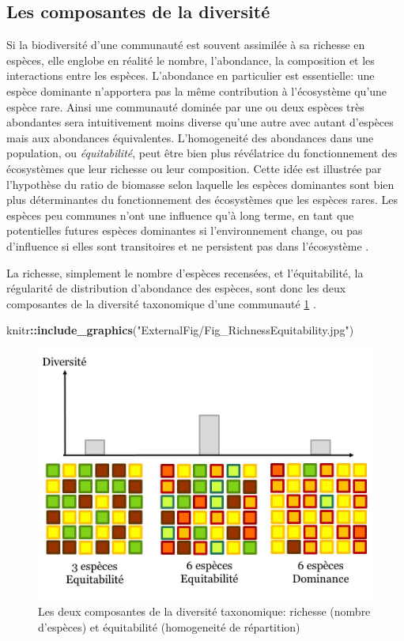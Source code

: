 \documentclass[
  11pt,
  french,
  A4paper,
  extrafontsizes,onecolumn,openright
  ]{memoir}
\newenvironment{Shaded}{\begin{snugshade}}{\end{snugshade}}
\newcommand{\KeywordTok}[1]{\textcolor[rgb]{0.13,0.29,0.53}{\textbf{#1}}}
\newcommand{\StringTok}[1]{\textcolor[rgb]{0.31,0.60,0.02}{#1}}
\newcommand{\OperatorTok}[1]{\textcolor[rgb]{0.81,0.36,0.00}{\textbf{#1}}}
\newcommand{\NormalTok}[1]{#1}
\begin{document}
\subsection{Les composantes de la
diversité}\label{les-composantes-de-la-diversite}

Si la biodiversité d'une communauté est souvent assimilée à sa richesse
en espèces, elle englobe en réalité le nombre, l'abondance, la
composition et les interactions entre les espèces. L'abondance en
particulier est essentielle: une espèce dominante n'apportera pas la
même contribution à l'écosystème qu'une espèce rare. Ainsi une
communauté dominée par une ou deux espèces très abondantes sera
intuitivement moins diverse qu'une autre avec autant d'espèces mais aux
abondances équivalentes. L'homogeneité des abondances dans une
population, ou \emph{équitabilité}, peut être bien plus révélatrice du
fonctionnement des écosystèmes que leur richesse ou leur composition.
Cette idée est illustrée par l'hypothèse du ratio de biomasse selon
laquelle les espèces dominantes sont bien plus déterminantes du
fonctionnement des écosystèmes que les espèces rares. Les espèces peu
communes n'ont une influence qu'à long terme, en tant que potentielles
futures espèces dominantes si l'environnement change, ou pas d'influence
si elles sont transitoires et ne persistent pas dans l'écosystème
\autocite{Grime1998}.

La richesse, simplement le nombre d'espèces recensées, et
l'équitabilité, la régularité de distribution d'abondance des espèces,
sont donc les deux composantes de la diversité taxonomique d'une
communauté \ref{fig:RichEqu} \autocites{Whittaker1965}{Magurran2004}.

\begin{Shaded}
\begin{Highlighting}[]
\NormalTok{knitr}\OperatorTok{::}\KeywordTok{include_graphics}\NormalTok{(}\StringTok{"ExternalFig/Fig_RichnessEquitability.jpg"}\NormalTok{)}
\end{Highlighting}
\end{Shaded}

\begin{figure}

{\centering \includegraphics[width=0.6\linewidth]{ExternalFig/Fig_RichnessEquitability} 

}

\caption{Les deux composantes de la diversité taxonomique: richesse (nombre d'espèces) et équitabilité (homogeneité de répartition)}\label{fig:RichEqu}
\end{figure}
\end{document}
